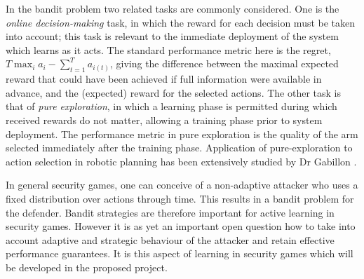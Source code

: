 
In the bandit problem two related tasks are commonly considered.  One is the {\em online decision-making} task, in which the reward for each decision must be taken into account; this task is relevant to the immediate deployment of the system which learns as it acts.  The standard performance metric here is the regret, $T\max_i a_i - \sum_{t=1}^T a_{i(t)}$, giving the difference between the maximal expected reward that could have been achieved if full information were available in advance, and the (expected) reward for the selected actions.  The other task is that of {\em pure exploration}, in which a learning phase is permitted during which received rewards do not matter, allowing a training phase prior to system deployment.  The performance metric in pure exploration is the quality of the arm selected immediately after the training phase.  Application of pure-exploration to  action selection in robotic planning has been extensively studied by Dr Gabillon \cite{Gabillon11MB}. 

In general security games, one can conceive of a non-adaptive attacker who uses a fixed distribution over actions through time.  This results in a bandit problem for the defender.
Bandit strategies are therefore important for active learning in security games.  However it is as yet an important open question how to take into account adaptive and strategic behaviour of the attacker and retain effective performance guarantees.  It is this aspect of learning in security games which will be developed in the proposed project.
  

